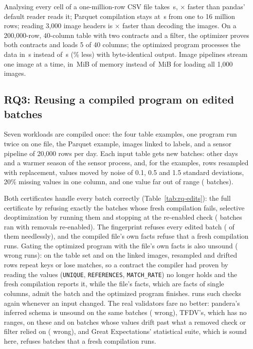 Analysing every cell of a one-million-row CSV file takes \CsvMillion\,s, \CsvSpeedup$\times$ faster
than pandas' default reader reads it; Parquet compilation stays at \PqSixteen\,s from one to 16
million rows; reading 3,000 image headers is \HdrRatio$\times$ faster than decoding the images. On a
200,000-row, 40-column table with two contracts and a filter, the optimizer proves both contracts and
loads 5 of 40 columns; the optimized program processes the data in \TabProcOpt\,s instead of
\TabProcOz\,s (\TabCut\% less) with byte-identical output. Image pipelines stream one image at a
time, in \ImgPlMem\,MiB of memory instead of \ImgBaseMem\,MiB for loading all 1,000 images.

\subsection{RQ3: Reusing a compiled program on edited batches}\label{sec:rq-edits}

Seven workloads are compiled once: the four table examples, one program run twice on one file, the
Parquet example, images linked to labels, and a sensor pipeline of 20,000 rows per day. Each input
table gets new batches: other days and a warmer season of the sensor process, and, for the examples,
rows resampled with replacement, values moved by noise of 0.1, 0.5 and 1.5 standard deviations, 20\%
missing values in one column, and one value far out of range (\CertBatches{} batches).



Both certificates handle every batch correctly (Table~\ref{tab:rq-edits}): the full certificate by
refusing exactly the batches whose fresh compilation fails, selective deoptimization by running them
and stopping at the re-enabled check (\CertDeopted{} batches ran with removals re-enabled). The
fingerprint refuses every edited batch (\CertFpNeedless{} of them needlessly), and the compiled file's
own facts refuse \CertFactsNeedless{} that a fresh compilation runs. Gating the
optimized program with the file's own facts is also unsound (\CertFactsUnsound{} wrong runs): on the
table set and on the linked images, resampled and drifted rows repeat keys or lose matches, so a
contract the compiler had proven by reading the values (\texttt{UNIQUE}, \texttt{REFERENCES},
\texttt{MATCH\_RATE}) no longer holds and the fresh compilation reports it, while the file's facts,
which are facts of single columns, admit the batch and the optimized program finishes. \PL runs such
checks again whenever an input changed. The real validators fare no better: pandera's inferred schema
is unsound on the same batches (\CertPanderaAllUnsound{} wrong), TFDV's, which has no ranges, on these
and on batches whose values drift past what a removed check or filter relied on (\CertTfdvAllUnsound{}
wrong), and Great Expectations' statistical suite, which
is sound here, refuses \CertGxAllNeedless{} batches that a fresh compilation runs.

